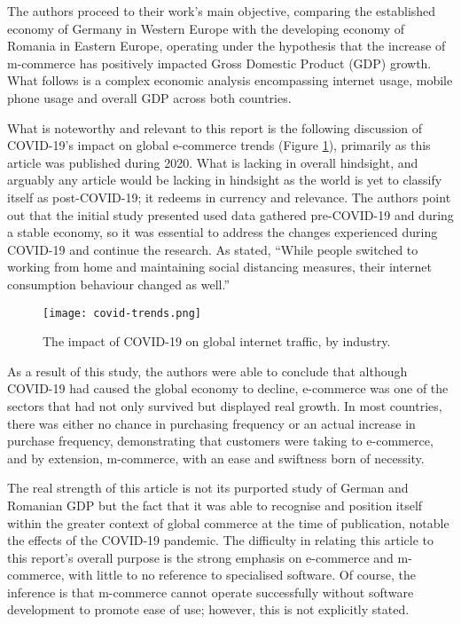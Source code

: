\documentclass[12pt]{article}
\begin{document}
The authors proceed to their work’s main objective, comparing the established economy of Germany in Western Europe with the developing economy of Romania in Eastern Europe, operating under the hypothesis that the increase of m-commerce has positively impacted Gross Domestic Product (GDP) growth. What follows is a complex economic analysis encompassing internet usage, mobile phone usage and overall GDP across both countries. \par 

What is noteworthy and relevant to this report is the following discussion of COVID-19’s impact on global e-commerce trends (Figure \ref{fig:trends}), primarily as this article was published during 2020. What is lacking in overall hindsight, and arguably any article would be lacking in hindsight as the world is yet to classify itself as post-COVID-19; it redeems in currency and relevance. The authors point out that the initial study presented used data gathered pre-COVID-19 and during a stable economy, so it was essential to address the changes experienced during COVID-19 and continue the research. As stated, “While people switched to working from home and maintaining social distancing measures, their internet consumption behaviour changed as well.” \par 

\vspace{0.5cm}
\begin{figure}[H]
    \centering
    \texttt{[image: covid-trends.png]}
    \caption{The impact of COVID-19 on global internet traffic, by industry.\cite{pantelimon}}
    \label{fig:trends}
\end{figure}

As a result of this study, the authors were able to conclude that although COVID-19 had caused the global economy to decline, e-commerce was one of the sectors that had not only survived but displayed real growth. In most countries, there was either no chance in purchasing frequency or an actual increase in purchase frequency, demonstrating that customers were taking to e-commerce, and by extension, m-commerce, with an ease and swiftness born of necessity. \par 

The real strength of this article is not its purported study of German and Romanian GDP but the fact that it was able to recognise and position itself within the greater context of global commerce at the time of publication, notable the effects of the COVID-19 pandemic. The difficulty in relating this article to this report’s overall purpose is the strong emphasis on e-commerce and m-commerce, with little to no reference to specialised software. Of course, the inference is that m-commerce cannot operate successfully without software development to promote ease of use; however, this is not explicitly stated.
\end{document}
